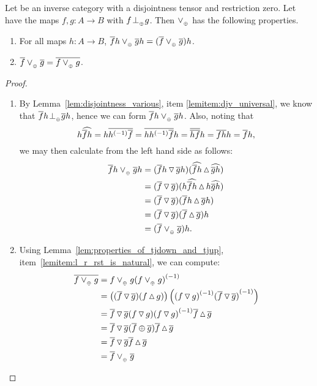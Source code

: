 \begin{lemma}\label{lem:tensor_disjoint_join_properties}
  Let \X be an inverse category with a disjointness tensor and restriction zero. Let \X have the
  maps $f,g: A \to B$ with $f{}_{{}_{}}{\perp_{{}_{\oplus}}} g$. Then $\vee_{{_{\oplus}}}$ has the following properties.
  \begin{enumerate}[{(}i{)}]
    \item For all maps $h:A \to B$, $\overline{f}h \vee_{{_{\oplus}}} \overline{g}h = (\overline{f}\vee_{{_{\oplus}}} \overline{g})h$.
      \label{lemitem:tdj_rst_universal}
    \item $\overline{f}\vee_{{_{\oplus}}} \overline{g} = \overline{f\vee_{{_{\oplus}}} g}$. \label{lemitem:tdj_rst_is_rst}
  \end{enumerate}
\end{lemma}
\begin{proof}
  \begin{enumerate}[{(}i{)}]
    \item By Lemma~\ref{lem:disjointness_various}, item \ref{lemitem:djv_universal}, we know that
    $\overline{f}h {}_{{}_{}}{\perp_{{}_{\oplus}}} \overline{g} h$, hence we can form $\overline{f}h \vee_{{_{\oplus}}} \overline{g}h$.
    Also, noting that
      \[
        h \widehat{\overline{f} h} = h \overline{{h}^{(-1)}\overline{f}} = \overline{h {h}^{(-1)} \overline{f}} h
          = \overline{\overline{h}\overline{f}} h = \overline{f} \overline{h}h = \overline{f} h,
      \]
      we may then calculate from the left hand side as follows:
      \begin{align*}
        \overline{f}h \vee_{{_{\oplus}}} \overline{g}h
          & = (\overline{f}h \operatorname{\triangledown} \overline{g} h) (\widehat{\overline{f}h}\operatorname{\vartriangle}\widehat{\overline{g} h})\\
          & = (\overline{f} \operatorname{\triangledown} \overline{g} ) (h\widehat{\overline{f}h}\operatorname{\vartriangle} h\widehat{\overline{g} h})\\
          & = (\overline{f} \operatorname{\triangledown} \overline{g} ) (\overline{f}h\operatorname{\vartriangle} \overline{g} h)\\
          & = (\overline{f} \operatorname{\triangledown} \overline{g} ) (\overline{f}\operatorname{\vartriangle} \overline{g} )h\\
          & = (\overline{f} \vee_{{_{\oplus}}} \overline{g} ) h.
      \end{align*}
    \item
    Using Lemma~\ref{lem:properties_of_tjdown_and_tjup}, item~\ref{lemitem:l_r_rst_is_natural},
    we can compute:
    \begin{align*}
      \overline{f\vee_{{_{\oplus}}} g} & = f \vee_{{_{\oplus}}} g {(f\vee_{{_{\oplus}}} g)}^{(-1)} \\
      & = \left((\overline{f} \operatorname{\triangledown} \overline{g})(f\operatorname{\vartriangle} g)\right)
             \left({(f\operatorname{\triangledown} g)}^{(-1)} {(\overline{f}\operatorname{\triangledown} \overline{g})}^{(-1)}\right)\\
      & = \overline{f}\operatorname{\triangledown}\overline{g}(f\operatorname{\triangledown} g) {(f\operatorname{\triangledown} g)}^{(-1)} \overline{f}\operatorname{\vartriangle} \overline{g}\\
      & = \overline{f}\operatorname{\triangledown}\overline{g}(\overline{f}\oplus \overline{g})\overline{f}\operatorname{\vartriangle} \overline{g}\\
      & = \overline{f}\operatorname{\triangledown}\overline{g}\overline{f}\operatorname{\vartriangle} \overline{g}\\
      & = \overline{f}\vee_{{_{\oplus}}}\overline{g}
    \end{align*}
  \end{enumerate}
\end{proof}


